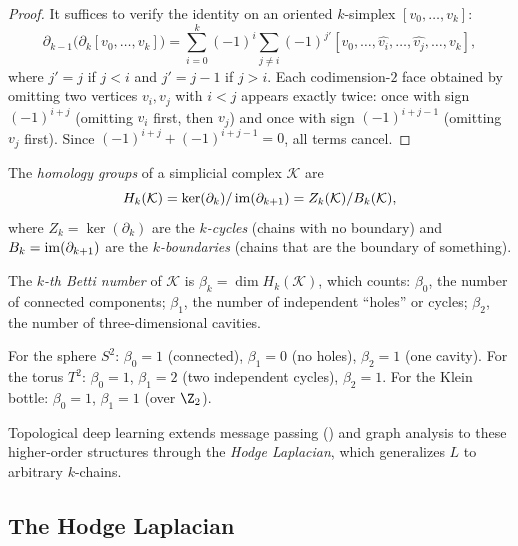 \begin{proof}
It suffices to verify the identity on an oriented $k$-simplex
$[v_0, \dots, v_k]$:
\[
  \partial_{k-1}\big(\partial_k [v_0, \dots, v_k]\big)
    = \sum_{i=0}^{k} (-1)^i \sum_{j \neq i} (-1)^{j'}
      [v_0, \dots, \widehat{v_i}, \dots, \widehat{v_j}, \dots, v_k],
\]
where $j' = j$ if $j < i$ and $j' = j-1$ if $j > i$. Each codimension-$2$ face
obtained by omitting two vertices $v_i, v_j$ with $i < j$ appears exactly twice:
once with sign $(-1)^{i+j}$ (omitting $v_i$ first, then $v_j$) and once with sign
$(-1)^{i+j-1}$ (omitting $v_j$ first). Since
$(-1)^{i+j} + (-1)^{i+j-1} = 0$, all terms cancel.
\end{proof}

\begin{definition}
\label{def:graphs:homology}
The \emph{homology groups} of a simplicial complex $\mathcal{K}$ are
\[
  H_k(\mathcal{K}) = \ker(\partial_k) / \operatorname{im}(\partial_{k+1})
    = Z_k(\mathcal{K}) / B_k(\mathcal{K}),
\]
where $Z_k = \ker(\partial_k)$ are the \emph{$k$-cycles} (chains with no
boundary) and $B_k = \operatorname{im}(\partial_{k+1})$ are the \emph{$k$-boundaries} (chains
that are the boundary of something).
\end{definition}

\begin{definition}
\label{def:graphs:betti}
The \emph{$k$-th Betti number} of $\mathcal{K}$ is $\beta_k = \dim H_k(\mathcal{K})$,
which counts: $\beta_0$, the number of connected components; $\beta_1$, the
number of independent ``holes'' or cycles; $\beta_2$, the number of
three-dimensional cavities.
\end{definition}

\begin{example}
\label{ex:graphs:betti}
For the sphere $S^2$: $\beta_0 = 1$ (connected), $\beta_1 = 0$ (no holes),
$\beta_2 = 1$ (one cavity). For the torus $T^2$: $\beta_0 = 1$, $\beta_1 = 2$
(two independent cycles), $\beta_2 = 1$. For the Klein bottle: $\beta_0 = 1$,
$\beta_1 = 1$ (over $\Z_2$).
\end{example}

Topological deep learning extends message passing () and
graph analysis to these higher-order structures through the \emph{Hodge
Laplacian}, which generalizes $L$ to arbitrary $k$-chains.

\subsection{The Hodge Laplacian}
\label{sec:graphs:hodge}

